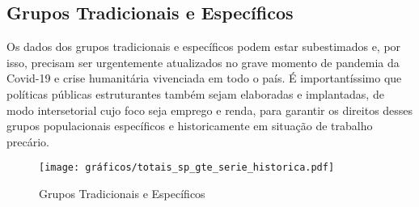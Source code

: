 \documentclass[14pt]{extarticle}
\begin{document}
\subsection{Grupos Tradicionais e Específicos}

%

Os dados dos grupos tradicionais e específicos podem estar subestimados e, por isso, precisam ser urgentemente atualizados no grave momento de pandemia da Covid-19 e crise humanitária vivenciada em todo o país. É importantíssimo que políticas públicas estruturantes também sejam elaboradas e implantadas, de modo intersetorial cujo foco seja emprego e renda, para garantir os direitos desses grupos populacionais específicos e historicamente em situação de trabalho precário.\\ 

\begin{figure}[H]
\centering
	\caption{Grupos Tradicionais e Específicos}
	\texttt{[image: gráficos/totais\_sp\_gte\_serie\_historica.pdf]}
	\label{fig:grupos_tradicionais_especificos}
\end{figure}

\end{document}
